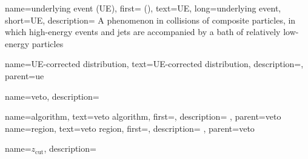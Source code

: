 {
  name=underlying event (UE),
  first= (),
  text=UE,
  long=underlying event,
  short=UE,
  description={
      A phenomenon in collisions of composite particles, in which high-energy events and jets are accompanied by a bath of relatively low-energy particles
  }
}

{
    name=UE-corrected distribution,
    text=UE-corrected distribution,
    description={},
    parent=ue
}


{
    name=veto,
    description={}
}

{
    name=algorithm,
    text=veto algorithm,
    first=,
    description={
    },
    parent=veto
}
{
    name=region,
    text=veto region,
    first=,
    description={
    },
    parent=veto
}

{
  name=\ensuremath{z_{\text{cut}}},
  description={}
}
